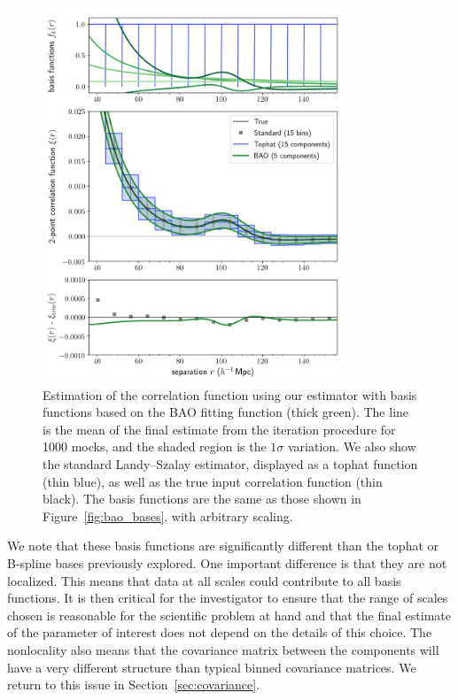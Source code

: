 \documentclass[modern]{aastex62}
\begin{document}
\label{fig:bao}
\begin{figure}[th]
\centering
    \includegraphics[width=0.8\textwidth]{xicomparison_2e-4_tophat8_baoiter}
    \caption{Estimation of the correlation function using our estimator with basis functions based on the BAO fitting function (thick green). The line is the mean of the final estimate from the iteration procedure for 1000 mocks, and the shaded region is the $1\sigma$ variation. We also show the standard Landy--Szalay estimator, displayed as a tophat function (thin blue), as well as the true input correlation function (thin black). The basis functions are the same as those shown in Figure~\ref{fig:bao_bases}, with arbitrary scaling.}
\end{figure}

We note that these basis functions are significantly different than the tophat or B-spline bases previously explored.
One important difference is that they are not localized.
This means that data at all scales could contribute to all basis functions.
It is then critical for the investigator to ensure that the range of scales chosen is reasonable for the scientific problem at hand and that the final estimate of the parameter of interest does not depend on the details of this choice.
The nonlocality also means that the covariance matrix between the components will have a very different structure than typical binned covariance matrices.
We return to this issue in Section~\ref{sec:covariance}.
\end{document}
